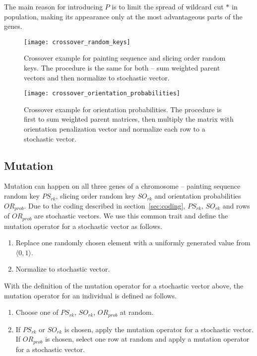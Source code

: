 The main reason for introducing $P$ is to limit the spread of wildcard cut $*$ in population,
making its appearance only at the most advantageous parts of the genes.

\begin{figure}[!htp]
    \texttt{[image: crossover\_random\_keys]}
    \caption[Crossover example for painting sequence and slicing order random keys]{
        Crossover example for painting sequence and slicing order random keys.
        The procedure is the same for both – sum weighted parent vectors and then normalize to stochastic vector.
    }
    \label{fig:crossover-random-keys}
\end{figure}

\begin{figure}[!htp]
    \texttt{[image: crossover\_orientation\_probabilities]}
    \caption[Crossover example for orientation probabilities]{
        Crossover example for orientation probabilities. The procedure is first to sum weighted parent matrices,
        then multiply the matrix with orientation penalization vector and normalize each row to a stochastic vector.}
    \label{fig:crossover-orientation-probabilities}
\end{figure}

\newpage
\subsection{Mutation}\label{subsec:mutation}

Mutation can happen on all three genes of a chromosome – painting sequence random key $PS_{rk}$,
slicing order random key $SO_{rk}$ and orientation probabilities $OR_{prob}$.
Due to the coding described in section~\ref{sec:coding}, $PS_{rk}$, $SO_{rk}$ and rows of $OR_{prob}$ are stochastic vectors.
We use this common trait and define the mutation operator for a stochastic vector as follows.

\begin{enumerate}
    \item Replace one randomly chosen element with a uniformly generated value from $\langle 0,1 \rangle$.
    \item Normalize to stochastic vector.
\end{enumerate}

With the definition of the mutation operator for a stochastic vector above, the mutation operator for an individual is defined as follows.

\begin{enumerate}
    \item Choose one of $PS_{rk}$, $SO_{rk}$, $OR_{prob}$ at random.
    \item If $PS_{rk}$ or $SO_{rk}$ is chosen, apply the mutation operator for a stochastic vector.\\
    If $OR_{prob}$ is chosen, select one row at random and apply a mutation operator for a stochastic vector.
\end{enumerate}

